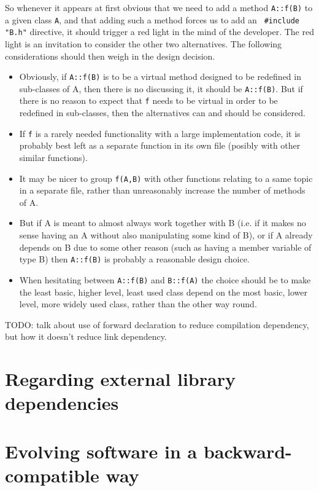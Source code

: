 \documentclass[11pt]{book}
\begin{document}
So whenever it appears at first obvious that we need to add a method
{\tt A::f(B)} to a
given class {\tt A}, and that adding such a method forces us to add an {\tt
\#include "B.h"} directive, it should trigger a red light in the mind of the
developer. The red light is an invitation to consider the other two alternatives. The
following considerations should then weigh in the design decision.
\begin{itemize}
\item Obviously, if {\tt A::f(B)} is to be a virtual method designed to be
  redefined in sub-classes of A, then there is no discussing it, it should be
  {\tt A::f(B)}. But if there is no reason to expect that {\tt f} needs to
  be virtual in order to be redefined in sub-classes, then the
  alternatives can and should be considered.
\item If {\tt f} is a rarely needed functionality with a large
  implementation code, it is probably best left as a separate function in
  its own file (posibly with other similar functions).
\item It may be nicer to group {\tt f(A,B)} with other functions relating
  to a same topic in a separate file, rather than unreasonably increase the
  number of methods of A.
\item But if A is meant to almost always work together with B (i.e. if it
  makes no sense having an A without also manipulating some kind of B), or
  if A already depends on B due to some other reason (such as having a
  member variable of type B) then
  {\tt A::f(B)} is probably a reasonable design choice. 
\item When hesitating between {\tt A::f(B)} and {\tt B::f(A)} the choice
  should be to make the least basic, higher level, least used class depend
  on the most basic, lower level, more widely used class, rather than the
  other way round.
\end{itemize}

TODO: talk about use of forward declaration to reduce compilation dependency,
but how it doesn't reduce link dependency.

\section{Regarding external library dependencies}

\section{Evolving software in a backward-compatible way}
\end{document}

